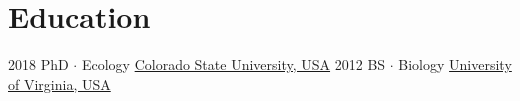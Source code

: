 \documentclass[letterpaper]{twentysecondcv} %
\begin{document}
\makeprofile %

\section{Education}

\begin{twenty} %
	\twentyitem
    	{2018}
        {}
        {PhD $\cdot$ Ecology}
        {\href{http://www.colostate.edu/}{Colorado State University, USA}}
        {}
        {}
	\twentyitem
    	{2012}
		{}
        {BS $\cdot$ Biology}
        {\href{http://www.virginia.edu/}{University of Virginia, USA}}
        {}
        {}
\end{twenty}


\end{document}

